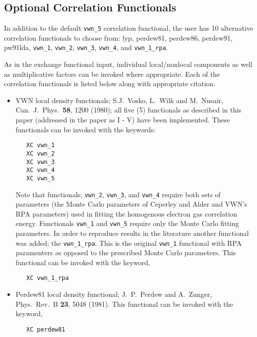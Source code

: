   
\subsection{Optional Correlation Functionals}

In addition to the default \verb+vwn_5+ correlation functional, the user has
10 alternative correlation functionals to choose from: lyp, perdew81,
perdew86, perdew91, pw91lda, \verb+vwn_1+, \verb+vwn_2+, \verb+vwn_3+,
\verb+vwn_4+, and \verb+vwn_1_rpa+.

As in the exchange functional input, individual local/nonlocal
components as well as multiplicative factors can be invoked where
appropriate.  Each of the correlation functionals is listed below along with
appropriate citation. 

\sloppy

\begin{itemize}
\item VWN local density functionals; S.J.~Vosko, L.~Wilk and M.~Nusair, 
  Can.~J.~Phys.~{\bf  58}, 1200 (1980); all five (5) functionals as
  described in this paper (addressed in the paper as I - V) have been
  implemented.  These functionals can be invoked with the keywords:
\begin{verbatim}
   XC vwn_1
   XC vwn_2
   XC vwn_3
   XC vwn_4
   XC vwn_5
\end{verbatim}

Note that functionals; \verb+vwn_2+, \verb+vwn_3+, and \verb+vwn_4+ require both sets of 
parameters (the Monte Carlo parameters of Ceperley and Alder and
VWN's RPA parameters) used in fitting the homogenous electron gas
correlation energy.  Functionals \verb+vwn_1+ and \verb+vwn_5+ require only the
Monte Carlo fitting parameters.  In order to reproduce results in the
literature another functional was added; the \verb+vwn_1_rpa+.  This is the
original \verb+vwn_1+ functional with RPA paramenters as opposed to the
prescribed Monte Carlo parameters.  This functional can be invoked
with the keyword,

\begin{verbatim}
   XC vwn_1_rpa
\end{verbatim}

\item Perdew81 local density functional; J.~P.~Perdew and A.~Zunger,
  Phys.~Rev.~B {\bf23}, 5048 (1981). This functional can be invoked with the
  keyword,
  
\begin{verbatim}
   XC perdew81
\end{verbatim}


\end{itemize}
